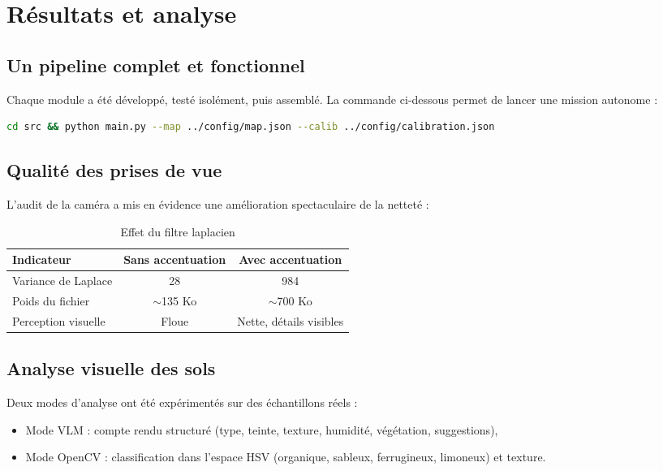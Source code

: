 \documentclass[a4paper,12pt,openany,titlepage]{scrartcl}
\begin{document}
\section{R\'esultats et analyse}

\subsection{Un pipeline complet et fonctionnel}
Chaque module a été développé, testé isolément, puis assemblé. La commande ci‑dessous permet de lancer une mission autonome :
\begin{lstlisting}[language=bash]
cd src && python main.py --map ../config/map.json --calib ../config/calibration.json
\end{lstlisting}

\subsection{Qualité des prises de vue}
L’audit de la caméra a mis en évidence une amélioration spectaculaire de la netteté :
\begin{table}[H]
\centering
\begin{tabular}{|l|c|c|}
\hline
\textbf{Indicateur} & \textbf{Sans accentuation} & \textbf{Avec accentuation} \\
\hline
Variance de Laplace & 28 & 984 \\
Poids du fichier & $\sim$135 Ko & $\sim$700 Ko \\
Perception visuelle & Floue & Nette, détails visibles \\
\hline
\end{tabular}
\caption{Effet du filtre laplacien}
\end{table}

\subsection{Analyse visuelle des sols}
Deux modes d’analyse ont été expérimentés sur des échantillons réels :
\begin{itemize}[nosep]
    \item Mode VLM : compte rendu structuré (type, teinte, texture, humidité, végétation, suggestions),
    \item Mode OpenCV : classification dans l’espace HSV (organique, sableux, ferrugineux, limoneux) et texture.
\end{itemize}
\end{document}
